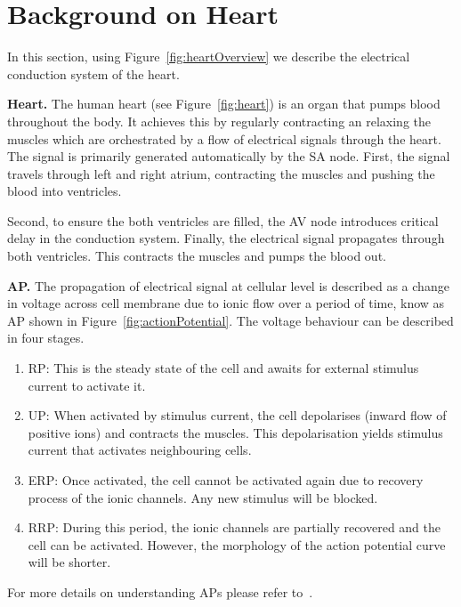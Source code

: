 \section{Background on Heart }
\begin{figure*}[htbp]
	\centering
	
	\caption{Electrical conduction systems of a heart}
	\label{fig:heartOverview}
\end{figure*}

In this section, using Figure~\ref{fig:heartOverview} we 
describe the electrical conduction system of the heart.

\noindent \textbf{Heart.}
The human heart (see Figure~\ref{fig:heart})
 is an organ that pumps blood throughout the body.
It achieves this by regularly contracting an relaxing the muscles
which are orchestrated by a flow of electrical signals through the heart.
The signal is primarily generated automatically by the \ac{SA} node.
First, the signal travels through left and right atrium, contracting 
the muscles and pushing the blood into ventricles.
 
Second, to ensure the both ventricles are filled, 
the \ac{AV} node introduces critical delay 
in the conduction system.   
Finally, the electrical signal propagates through 
both ventricles. This contracts the muscles and pumps the blood out.


	
\noindent \textbf{\acf{AP}.} 
The propagation of electrical signal at cellular level 
is described as a change in  voltage 
across cell membrane due to ionic flow over a period of time, 
know as \acf{AP} shown in Figure~\ref{fig:actionPotential}. 
The voltage behaviour can be described in four stages.
\begin{enumerate}
	\item \acf{RP}: This is the steady state of the cell and awaits for 
					external stimulus current to activate it.
	\item \acf{UP}: When activated by stimulus current, 
					the cell depolarises (inward flow of positive ions) and 
					contracts the muscles. This depolarisation yields 
					stimulus current that activates neighbouring cells.
	\item \acf{ERP}: Once activated, the cell cannot be activated again 
					 due to recovery process of the ionic channels. 
					 Any new stimulus will be blocked. 
	\item \acf{RRP}: During this period, the ionic channels are partially recovered
					 and the cell can be activated. However, the morphology
					 of the action potential curve will be shorter.
	
\end{enumerate} 
 For more details on understanding \acp{AP} please refer to~\cite{chen14}.\\

